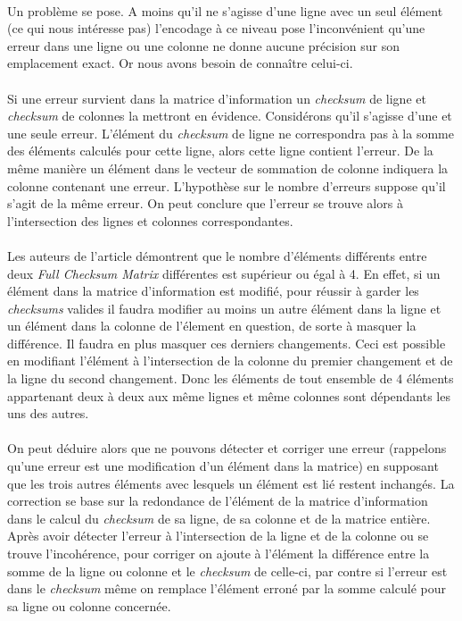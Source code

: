 \documentclass[a4paper, 10pt]{report}
\begin{document}
\paragraph*{}
Un problème se pose. A moins qu’il ne s’agisse d’une ligne avec un seul élément (ce qui nous intéresse pas) l’encodage 
à ce niveau pose l’inconvénient qu’une erreur dans une ligne ou une colonne ne donne aucune précision sur son
emplacement exact. Or nous avons besoin de conna\^itre celui-ci.
\paragraph*{}
Si une erreur survient dans la matrice d’information un \textit{checksum} de ligne et \textit{checksum} de colonnes 
la mettront en évidence.\newline
Considérons qu’il s’agisse d’une et une seule erreur. L’élément du \textit{checksum} de ligne ne correspondra pas 
à la somme des éléments calculés pour cette ligne, alors cette ligne contient l’erreur. De la même manière un élément 
dans le vecteur de sommation de colonne indiquera la colonne contenant une erreur. L’hypothèse sur le nombre d’erreurs 
suppose qu’il s’agit de la même erreur. On peut conclure que l’erreur se trouve alors à l’intersection des lignes et 
colonnes correspondantes.
\paragraph*{}
Les auteurs de l’article démontrent que le nombre d’éléments différents entre deux \textit{Full Checksum Matrix} différentes 
est supérieur ou égal à 4. En effet, si un élément dans la matrice d’information est modifié, pour réussir à garder 
les \textit{checksums} valides il faudra modifier au moins un autre élément dans la ligne et un élément dans la colonne de 
l'élement en question, de sorte à masquer la différence. Il faudra en plus masquer ces derniers changements. Ceci est possible
en modifiant l'élément à l'intersection de la colonne du premier changement et de la ligne du second changement. Donc les 
éléments de tout ensemble de 4 éléments appartenant deux à deux aux même lignes et même colonnes sont dépendants les uns des autres.
\paragraph*{}
On peut déduire alors que ne pouvons détecter et corriger une erreur (rappelons qu’une erreur est une modification d’un
élément dans la matrice) en supposant que les trois autres éléments avec lesquels un élément est lié restent inchangés.
La correction se base sur la redondance de l’élément de la matrice d’information dans le calcul du \textit{checksum} de 
sa ligne, de sa colonne et de la matrice entière. Après avoir détecter l’erreur à l’intersection de la ligne et de la 
colonne ou se trouve l’incohérence, pour corriger on ajoute à l’élément la différence entre la somme de la ligne ou 
colonne et le \textit{checksum} de celle-ci, par contre si l’erreur est dans le \textit{checksum} même on remplace 
l’élément erroné par la somme calculé pour sa ligne ou colonne concernée.
\end{document}
